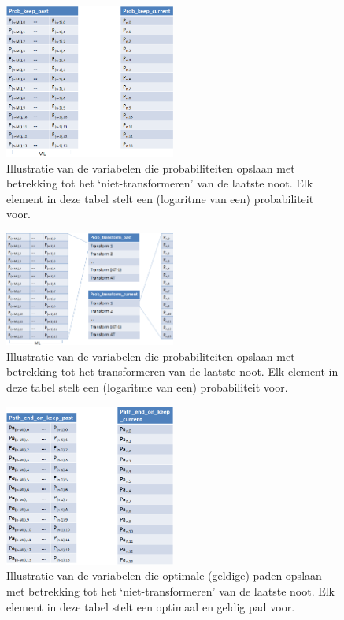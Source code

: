 \begin{figure}[!ht]
  \centering
  \includegraphics[width=0.5\textwidth]{4_Efficient_Toepassen_Transformatie/prob_keep_algo_2}
  \caption{Illustratie van de variabelen die probabiliteiten opslaan met betrekking tot het `niet-transformeren' van de laatste noot. Elk element in deze tabel stelt een (logaritme van een) probabiliteit voor.}
  \label{figuur:prob_keep_algo_2}
\end{figure}

\begin{figure}[!ht]
  \centering
  \includegraphics[width=0.5\textwidth]{4_Efficient_Toepassen_Transformatie/prob_transform_algo_2}
  \caption{Illustratie van de variabelen die probabiliteiten opslaan met betrekking tot het transformeren van de laatste noot. Elk element in deze tabel stelt een (logaritme van een) probabiliteit voor.}
  \label{figuur:prob_transform_algo_2}
\end{figure}

\begin{figure}[!ht]
  \centering
  \includegraphics[width=0.5\textwidth]{4_Efficient_Toepassen_Transformatie/path_keep_algo_2}
  \caption{Illustratie van de variabelen die optimale (geldige) paden opslaan met betrekking tot het `niet-transformeren' van de laatste noot. Elk element in deze tabel stelt een optimaal en geldig pad voor.}
  \label{figuur:path_keep_algo_2}
\end{figure}

